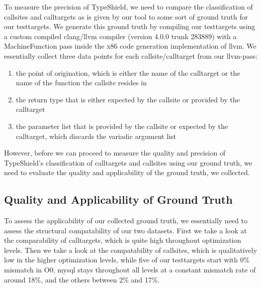 To measure the precision of TypeShield, we need to compare the classification of callsites and calltargets as is given by our tool to some sort of ground truth for our testtargets. We generate this ground truth by compiling our testtargets using a custom compiled clang/llvm compiler (version 4.0.0 trunk 283889) with a MachineFunction pass inside the x86 code generation implementation of llvm. We essentially collect three data points for each callsite/calltarget from our llvm-pass:
\begin{enumerate}
\item the point of origination, which is either the name of the calltarget or the name of the function the callsite resides in
\item the return type that is either expected by the callsite or provided by the calltarget
\item the parameter list that is provided by the callsite or expected by the calltarget, which discards the variadic argument list
\end{enumerate}
However, before we can proceed to measure the quality and precision of TypeShield's classification of calltargets and callsites using our ground truth, we need to evaluate the quality and applicability of the ground truth, we collected.

\subsection{Quality and Applicability of Ground Truth}
\label{subsection:typeshieldprecision}
To assess the applicability of our collected ground truth, we essentially need to assess the structural compatability of our two datasets. First we take a look at the comparability of calltargets, which is quite high throughout optimization levels. Then we take a look at the compatability of callsites, which is qualitatively low in the higher optimization levels, while five of our testtargets start with 0\% mismatch in O0, mysql stays throughout all levels at a constant mismatch rate of around 18\%, and the others between 2\% and 17\%.


